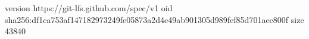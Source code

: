 version https://git-lfs.github.com/spec/v1
oid sha256:df1ca753af147182973249fe05873a2d4e49ab901305d989fef85d701aec800f
size 43840
